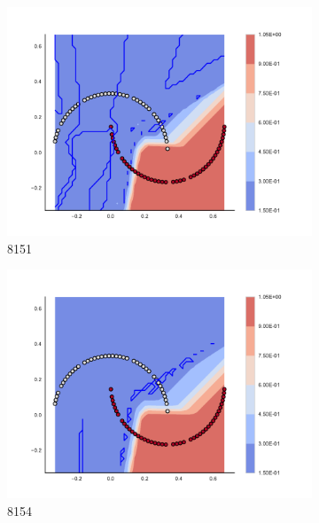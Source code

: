 \begin{figure}[h]
\begin{subfigure}[b]{0.09\textwidth}
    \includegraphics[clip, trim=2.35cm 1.75cm 4.5cm 0cm,width=\textwidth]{img/convergence/8151.pdf}
    \caption{8151}
    \label{fig:convergence_8151}
\end{subfigure}
%
\begin{subfigure}[b]{0.09\textwidth}
    \includegraphics[clip, trim=2.35cm 1.75cm 4.5cm 0cm,width=\textwidth]{img/convergence/8154.pdf}
    \caption{8154}
    \label{fig:convergence_8154}
\end{subfigure}
%
\begin{subfigure}[b]{0.09\textwidth}

\end{subfigure}
\end{figure}
